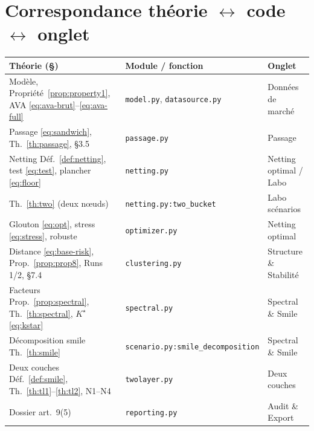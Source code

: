 \documentclass[11pt,a4paper]{article}
\newcommand{\code}[1]{\texttt{#1}}
\theoremstyle{plain}
\theoremstyle{definition}
\theoremstyle{remark}
\begin{document}
\appendix
\section{Correspondance théorie $\leftrightarrow$ code $\leftrightarrow$ onglet}

\begin{center}\small
\begin{tabular}{@{}p{4.5cm}p{5.2cm}p{4.6cm}@{}}
\toprule
\textbf{Théorie (\S)} & \textbf{Module / fonction} & \textbf{Onglet} \\
\midrule
Modèle, Propriété~\ref{prop:property1}, AVA \eqref{eq:ava-brut}--\eqref{eq:ava-full}
  & \code{model.py}, \code{datasource.py} & Données de marché \\
Passage \eqref{eq:sandwich}, Th.~\ref{th:passage}, \S3.5
  & \code{passage.py} & Passage \\
Netting Déf.~\ref{def:netting}, test \eqref{eq:test}, plancher \eqref{eq:floor}
  & \code{netting.py} & Netting optimal / Labo \\
Th.~\ref{th:two} (deux nœuds)
  & \code{netting.py:two\_bucket} & Labo scénarios \\
Glouton \eqref{eq:opt}, stress \eqref{eq:stress}, robuste
  & \code{optimizer.py} & Netting optimal \\
Distance \eqref{eq:base-risk}, Prop.~\ref{prop:prop8}, Runs 1/2, \S7.4
  & \code{clustering.py} & Structure \& Stabilité \\
Facteurs Prop.~\ref{prop:spectral}, Th.~\ref{th:spectral}, $K^\star$ \eqref{eq:kstar}
  & \code{spectral.py} & Spectral \& Smile \\
Décomposition smile Th.~\ref{th:smile}
  & \code{scenario.py:smile\_decomposition} & Spectral \& Smile \\
Deux couches Déf.~\ref{def:smile}, Th.~\ref{th:tl1}--\ref{th:tl2}, N1--N4
  & \code{twolayer.py} & Deux couches \\
Dossier art.~9(5)
  & \code{reporting.py} & Audit \& Export \\
\bottomrule
\end{tabular}
\end{center}
\end{document}
